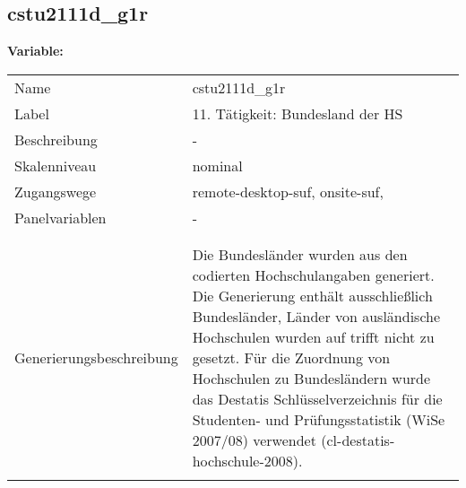 	
	
	\subsection{cstu2111d\_g1r}
	\label{subSection:cstu2111d_g1r}

	\noindent\textbf{Variable:}\\
		\begin{tabular}{lL{11.3cm}}
			\label{tableVariable:cstu2111d_g1r}
			Name & cstu2111d\_g1r \\
			Label & 11. Tätigkeit: Bundesland der HS \\
			Beschreibung & - \\
			Skalenniveau & nominal \\
			Zugangswege &
				remote-desktop-suf,
				onsite-suf,
 \\
			Panelvariablen & -
			 \\
			 \\
 \\
					Generierungsbeschreibung & Die Bundesländer wurden aus den codierten Hochschulangaben generiert. Die Generierung enthält ausschließlich Bundesländer, Länder von ausländische Hochschulen wurden auf trifft nicht zu gesetzt. Für die Zuordnung von Hochschulen zu Bundesländern wurde das Destatis Schlüsselverzeichnis für die Studenten- und Prüfungsstatistik (WiSe 2007/08) verwendet (cl-destatis-hochschule-2008).
				 \\	
			 \\
		\end{tabular}






